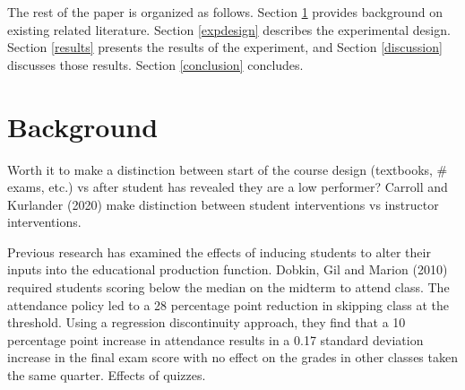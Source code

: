 \documentclass[12pt]{article}
\begin{document}



The rest of the paper is organized as follows. Section \ref{background} provides background on existing related literature. Section \ref{expdesign} describes the experimental design. Section \ref{results} presents the results of the experiment, and Section \ref{discussion} discusses those results. Section \ref{conclusion} concludes.



\section{Background} \label{background}

Worth it to make a distinction between start of the course design (textbooks, \# exams, etc.) vs after student has revealed they are a low performer?  Carroll and Kurlander (2020) make distinction between student interventions vs instructor interventions.   

Previous research has examined the effects of inducing students to alter their inputs into the educational production function. Dobkin, Gil and Marion (2010) required students scoring below the median on the midterm to attend class.  The attendance policy led to a 28 percentage point reduction in skipping class at the threshold.  Using a regression discontinuity approach, they find that a 10 percentage point increase in attendance results in a 0.17 standard deviation increase in the final exam score with no effect on the grades in other classes taken the same quarter. Effects of quizzes.  
\end{document}
